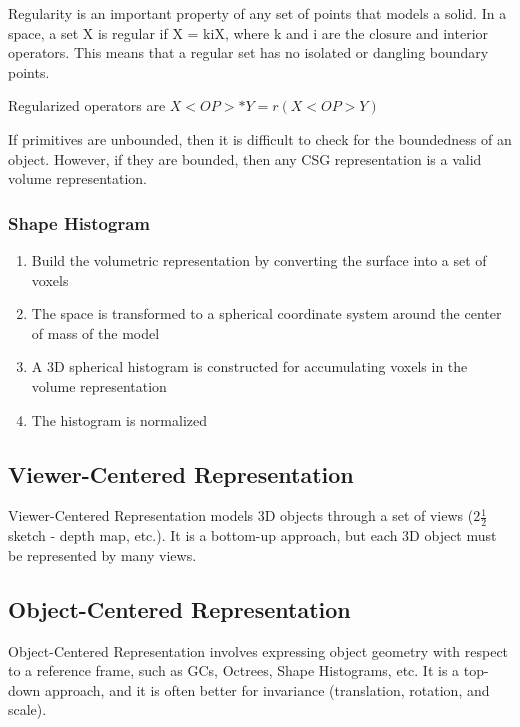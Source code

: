\documentclass{article}
\begin{document}
\begin{multicols}{2}
Regularity is an important property of any set of points that models a solid. In a space, a set X is regular if X = kiX, where k and i are the closure and interior operators. This means that a regular set has no isolated or dangling boundary points.

Regularized operators are
$X <OP> * Y =  r(X <OP> Y)$

If primitives are unbounded, then it is difficult to check for the boundedness of an object. However, if they are bounded, then any CSG representation is a valid volume representation.

\subsubsection{Shape Histogram}

\begin{enumerate}
  \item {Build the volumetric representation by converting the surface into a set of voxels}
  \item {The space is transformed to a spherical coordinate system around the center of mass of the model}
  \item {A 3D spherical histogram is constructed for accumulating voxels in the volume representation}
  \item {The histogram is normalized}
\end{enumerate}

\subsection{Viewer-Centered Representation}

Viewer-Centered Representation models 3D objects through a set of views ($2 \frac{1}{2}$ sketch - depth map, etc.). It is a bottom-up approach, but each 3D object must be represented by many views.

\subsection{Object-Centered Representation}

Object-Centered Representation involves expressing object geometry with respect to a reference frame, such as GCs, Octrees, Shape Histograms, etc. It is a top-down approach, and it is often better for invariance (translation, rotation, and scale).

\end{multicols}
\end{document}
